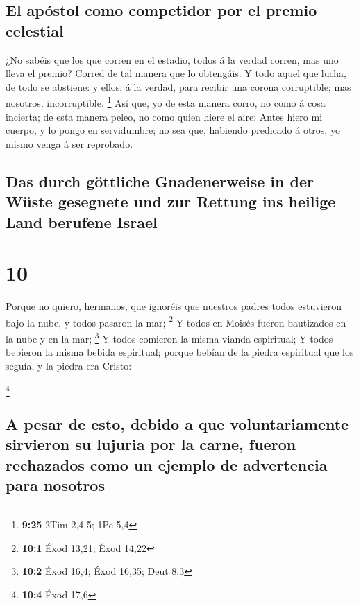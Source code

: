 \hypertarget{el-apuxf3stol-como-competidor-por-el-premio-celestial}{%
\subsection{El apóstol como competidor por el premio
celestial}\label{el-apuxf3stol-como-competidor-por-el-premio-celestial}}

 ¿No sabéis que los que corren en el estadio, todos á la
verdad corren, mas uno lleva el premio? Corred de tal manera que lo
obtengáis.  Y todo aquel que lucha, de todo se abstiene: y
ellos, á la verdad, para recibir una corona corruptible; mas nosotros,
incorruptible. \footnote{\textbf{9:25} 2Tim 2,4-5; 1Pe 5,4}
 Así que, yo de esta manera corro, no como á cosa incierta;
de esta manera peleo, no como quien hiere el aire:  Antes
hiero mi cuerpo, y lo pongo en servidumbre; no sea que, habiendo
predicado á otros, yo mismo venga á ser reprobado.

\hypertarget{das-durch-guxf6ttliche-gnadenerweise-in-der-wuxfcste-gesegnete-und-zur-rettung-ins-heilige-land-berufene-israel}{%
\subsection{Das durch göttliche Gnadenerweise in der Wüste gesegnete und
zur Rettung ins heilige Land berufene
Israel}\label{das-durch-guxf6ttliche-gnadenerweise-in-der-wuxfcste-gesegnete-und-zur-rettung-ins-heilige-land-berufene-israel}}

\hypertarget{section-9}{%
\section{10}\label{section-9}}

 Porque no quiero, hermanos, que ignoréis que nuestros
padres todos estuvieron bajo la nube, y todos pasaron la mar;
\footnote{\textbf{10:1} Éxod 13,21; Éxod 14,22}  Y todos en
Moisés fueron bautizados en la nube y en la mar; \footnote{\textbf{10:2}
  Éxod 16,4; Éxod 16,35; Deut 8,3}  Y todos comieron la
misma vianda espiritual;  Y todos bebieron la misma bebida
espiritual; porque bebían de la piedra espiritual que los seguía, y la
piedra era Cristo:

\footnote{\textbf{10:4} Éxod 17,6}

\hypertarget{a-pesar-de-esto-debido-a-que-voluntariamente-sirvieron-su-lujuria-por-la-carne-fueron-rechazados-como-un-ejemplo-de-advertencia-para-nosotros}{%
\subsection{A pesar de esto, debido a que voluntariamente sirvieron su
lujuria por la carne, fueron rechazados como un ejemplo de advertencia
para
nosotros}\label{a-pesar-de-esto-debido-a-que-voluntariamente-sirvieron-su-lujuria-por-la-carne-fueron-rechazados-como-un-ejemplo-de-advertencia-para-nosotros}}


